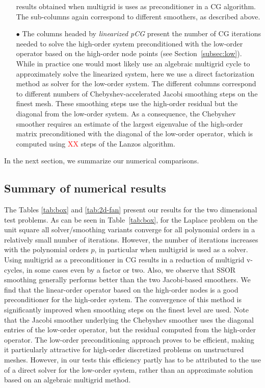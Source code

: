 \documentclass[smallcondensed,final]{svjour3}     %
\newcommand{\todo}[1]{\textcolor{red}{ #1}}
\begin{document}
\begin{itemize}
  results obtained when multigrid is uses as preconditioner in a CG
  algorithm. The sub-columns again correspond to different smoothers,
  as described above.
\item[$\bullet$] The columns headed by \emph{linearized pCG} present
  the number of CG iterations needed to solve the high-order system
  preconditioned with the low-order operator based on the high-order
  node points (see Section~\ref{subsec:low}). While in practice one
  would most likely use an algebraic multigrid cycle to approximately
  solve the linearized system, here we use a direct factorization
  method as solver for the low-order system. The different columns
  correspond to different numbers of Chebyshev-accelerated Jacobi
  smoothing steps on the finest mesh. These smoothing steps use the
  high-order residual but the diagonal from the low-order system. As a
  consequence, the Chebyshev smoother requires an estimate of the
  largest eigenvalue of the high-order matrix preconditioned with the
  diagonal of the low-order operator, which is computed using
  \todo{XX} steps of the Lanzos algorithm.
\end{itemize}
In the next section, we summarize our numerical comparisons.

\subsection{Summary of numerical results}\label{subsec:results}
The Tables \ref{tab:box} and \ref{tab:2d-fan} present our results for
the two dimensional test problems. As can be seen in
Table~\ref{tab:box}, for the Laplace problem on the unit square all
solver/smoothing variants converge for all polynomial orders in a
relatively small number of iterations. However, the number of
iterations increases with the polynomial orders $p$, in particular
when multigrid is used as a solver. Using multigrid as a
preconditioner in CG results in a reduction of multigrid v-cycles, in
some cases even by a factor or two. Also, we observe that SSOR
smoothing generally performs better than the two Jacobi-based
smoothers. We find that the linear-order operator based on the
high-order nodes is a good preconditioner for the high-order
system. The convergence of this method is significantly improved when
smoothing steps on the finest level are used. Note that the Jacobi
smoother underlying the Chebyshev smoother uses the diagonal entries
of the low-order operator, but the residual computed from the
high-order operator. The low-order preconditioning approach proves to
be efficient, making it particularly attractive for high-order
discretized problems on unstructured meshes. However, in our tests
this efficiency partly has to be attributed to the use of a direct
solver for the low-order system, rather than an approximate solution
based on an algebraic multigrid method.
\end{document}
